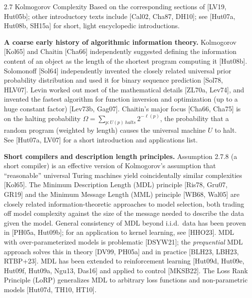 \documentclass[aspectratio=169,10pt]{beamer}
\begin{document}
\begin{frame}[allowframebreaks]{2.7 Kolmogorov Complexity}
  Based on the corresponding sections of [LV19, Hut05b]; other introductory
  texts include [Cal02, Cha87, DH10]; see [Hut07a, Hut08b, SH15a] for short,
  light encyclopedic introductions.

  \textbf{A coarse early history of algorithmic information theory.}
  Kolmogorov [Kol65] and Chaitin [Cha66] independently suggested defining
  the information content of an object as the length of the shortest
  program computing it [Hut08b]. Solomonoff [Sol64] independently invented
  the closely related universal prior probability distribution and used it
  for binary sequence prediction [Sol78, HLV07]. Levin worked out most of
  the mathematical details [ZL70a, Lev74], and invented the fastest
  algorithm for function inversion and optimization (up to a huge constant
  factor) [Lev73b, Gag07]. Chaitin's major focus [Cha66, Cha75] is on the
  halting probability $\Omega=\sum_{p:U(p)\ halts} 2^{-\ell(p)}$, the
  probability that a random program (weighted by length) causes the
  universal machine $U$ to halt. See [Hut07a, LV07] for a short
  introduction and applications list.

  \framebreak

  \textbf{Short compilers and description length principles.} Assumption
  2.7.8 (a short compiler) is an effective version of Kolmogorov's
  assumption that ``reasonable'' universal Turing machines yield
  coincidentally similar complexities [Kol65]. The Minimum Description
  Length (MDL) principle [Ris78, Gru07, GR19] and the Minimum Message
  Length (MML) principle [WB68, Wal05] are closely related
  information-theoretic approaches to model selection, both trading off
  model complexity against the size of the message needed to describe the
  data given the model. General consistency of MDL beyond i.i.d.\ data has
  been proven in [PH05a, Hut09b]; for an application to kernel learning,
  see [HHO23]. MDL with over-parameterized models is problematic [DSYW21];
  the \emph{prequential} MDL approach solves this in theory [DV99, PH05a]
  and in practice [BLH23, LBH23, RTBP+23]. MDL has been extended to
  reinforcement learning [Hut09d, Hut09e, Hut09f, Hut09a, Ngu13, Das16] and
  applied to control [MKSB22]. The Loss Rank Principle (LoRP) generalizes
  MDL to arbitrary loss functions and non-parametric models [Hut07d, TH10,
  HT10].

  \framebreak


\end{frame}
\end{document}
